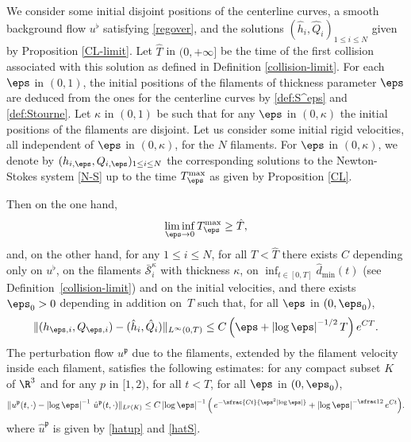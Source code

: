 \begin{thm}
\label{main}
We consider some initial disjoint positions of the centerline curves, a smooth background flow
$u^\flat$ satisfying \eqref{regover}, and the solutions $({\hat h}_i, {\hat Q}_i)_{1 \leq i \leq N}$ given by Proposition \ref{CL-limit}. Let $\hat T $ in $(0,+\infty]$ be the time of the first collision associated with this solution as defined in Definition \ref{collision-limit}.
For each $\eps$ in $(0,1)$,
the initial positions of the filaments of thickness parameter $\eps$ are deduced from the ones for the centerline curves by \eqref{def:S^eps} and
\eqref{def:Stourne}. Let $\kappa$ in $(0,1)$ be such that for any $\eps$ in $(0,\kappa)$ the initial positions of the filaments are disjoint.
Let us consider some initial rigid velocities, all independent of $\eps$ in $(0,\kappa)$, for the $N$ filaments.
For $\eps$ in $(0,\kappa)$, we denote by $(h_{i,\eps}, Q_{i,\eps})_{1 \leq i \leq N}$ the corresponding solutions to the Newton-Stokes system \eqref{N-S} up to the time $T^{\max}_\eps$ as given by Proposition \ref{CL}.

Then on the one hand,
\begin{equation}
\label{temps}
\liminf_{\eps \to 0} T^{\max}_\eps \geq \hat T,
\end{equation}
and, on the other hand, for any $1 \leq i \leq N$,
for all $T < \hat T$ there exists $C$ depending only on $u^\flat$, on
the filaments
${\bar{ \mathcal S}_i^\kappa}$ with thickness $\kappa$, on
$\inf_{t \in [0,T]} \hat d_{\min}(t)$ (see Definition~\ref{collision-limit}) and on the initial velocities, and there exists $\eps_0 > 0$ depending in addition on~$T$
such that, for all $\eps $ in $(0, \eps_0)$,
\begin{equation} \label{est:main.positions}
\|(h_{\eps, i}, Q_{\eps, i}) - ({\hat h}_i, {\hat Q}_i)\|_{L^\infty(0,T)}
\leq C \left(\eps + \left|\log \eps\right|^{-1/2} T\right) e^{C T}.
\end{equation}
The perturbation flow $u^\mathfrak{p}$ due to the filaments, extended by the filament velocity inside each filament,
satisfies the following estimates: for any compact subset $K$ of $\R^3$ and for any $p $ in $[1, 2)$, for all $t < T$, for all $\eps $ in $(0, \eps_0)$,
\begin{equation}
\label{conv-flui-precised}
\| u^\mathfrak{p} (t,\cdot) - \left|\log \eps\right|^{-1} \, {\hat u}^\mathfrak{p} (t,\cdot) \|_{L^p (K) }
\leq
C \left|\log \eps\right|^{-1} \Bigl(
\, e^{- \sfrac{C t}{\eps^2 \left|\log \eps\right|}} + \left|\log \eps\right|^{-\sfrac12} e^{C t} \Bigr).
\end{equation}
where ${\hat u}^\mathfrak{p} $ is given by \eqref{hatup} and \eqref{hatS}.
\end{thm}

